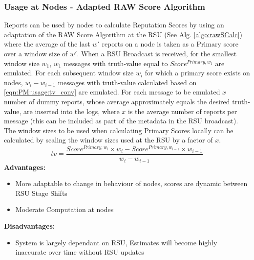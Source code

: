\documentclass[journal]{IEEEtran}
\begin{document}
\subsubsection{Usage at Nodes - Adapted RAW Score Algorithm}
\label{sec:PM:usage:raw@node}
Reports can be used by nodes to calculate Reputation Scores by using an adaptation of the RAW Score Algorithm at the RSU (See Alg. \ref{algo:rawSCalc}) where the average of the last $ w' $ reports on a node is taken as a Primary score over a window size of $ w' $. When a RSU Broadcast is received, for the smallest window size $ w_1 $, $ w_1 $ messages with truth-value equal to $ Score^{Primary,w_1} $ are emulated. For each subsequent window size $ w_i $ for which a primary score exists on nodes, $ w_i - w_{i-1} $ messages with truth-value calculated based on \ref{eqn:PM:usage:tv_conv} are emulated. For each message to be emulated $ x $ number of dummy reports, whose average approximately equals the desired truth-value, are inserted into the logs, where $ x $ is the average number of reports per message (this can be included as part of the metadata in the RSU broadcast). The window sizes to be used when calculating Primary Scores locally can be calculated by scaling the window sizes used at the RSU by a factor of $ x $.
	\begin{equation}
	\label{eqn:PM:usage:tv_conv}
		tv = \frac{Score^{Primary,w_i}\times w_i - Score^{Primary,w_{i-1}}\times w_{i-1}}{w_i - w_{i-1}}
	\end{equation}
\textbf{Advantages:}
	\begin{itemize}
		\item More adaptable to change in behaviour of nodes, scores are dynamic between RSU Stage Shifts
		\item Moderate Computation at nodes
	\end{itemize}
\textbf{Disadvantages:} 
	\begin{itemize}
		\item System is largely dependant on RSU, Estimates will become highly inaccurate over time without RSU updates
	\end{itemize}
\end{document}
